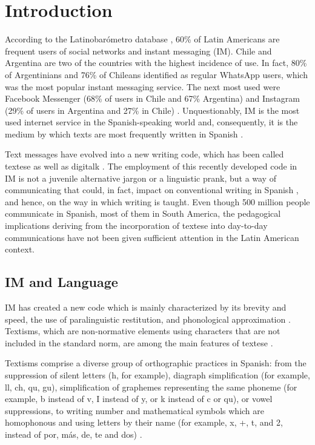 \documentclass[english]{textolivre}
\begin{document}
\section{Introduction}\label{sec-intro}
According to the Latinobarómetro database \cite{Latinobarometro2018}, 60\% of Latin Americans are frequent users of social networks and instant messaging (IM). Chile and Argentina are two of the countries with the highest incidence of use. In fact, 80\% of Argentinians and 76\% of Chileans identified as regular WhatsApp users, which was the most popular instant messaging service. The next most used were Facebook Messenger (68\% of users in Chile and 67\% Argentina) and Instagram (29\% of users in Argentina and 27\% in Chile) \cite{Chevalier2019}. Unquestionably, IM is the most used internet service in the Spanish-speaking world and, consequently, it is the medium by which texts are most frequently written in Spanish \cite{Martín2016}.

Text messages have evolved into a new writing code, which has been called textese \cite{Johnson2015} as well as digitalk \cite{Turner2010}. The employment of this recently developed code in IM is not a juvenile alternative jargon \cite{Betti2006} or a linguistic prank, but a way of communicating that could, in fact, impact on conventional writing in Spanish \cite{Alonso2008, MasAlvarez2012a}, and hence, on the way in which writing is taught. Even though 500 million people communicate in Spanish, most of them in South America, the pedagogical implications deriving from the incorporation of textese into day-to-day communications have not been given sufficient attention in the Latin American context. 

\subsection{IM and Language}\label{sec-IM}
IM has created a new code which is mainly characterized by its brevity and speed, the use of paralinguistic restitution, and phonological approximation \cite{Thurlow2013, Turner2014}. Textisms, which are non-normative elements using characters that are not included in the standard norm, are among the main features of textese \cite{Johnson2015}.

Textisms comprise a diverse group of orthographic practices in Spanish: from the suppression of silent letters (h, for example), diagraph simplification (for example, ll, ch, qu, gu), simplification of graphemes representing the same phoneme (for example, b instead of v, I instead of y, or k instead of c or qu), or vowel suppressions, to writing number and mathematical symbols which are homophonous and using letters by their name (for example, x, +, t, and 2, instead of por, más, de, te and dos) \cite{Gomez-Camacho2018}.
\end{document}
